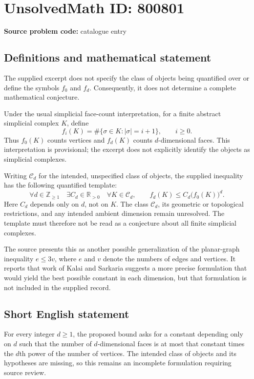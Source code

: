 \documentclass[11pt]{article}
\newcommand{\Z}{\mathbb{Z}}
\newcommand{\R}{\mathbb{R}}
\begin{document}
\section*{UnsolvedMath ID: 800801}
\textbf{Source problem code:} catalogue entry
\subsection{Definitions and mathematical statement}
The supplied excerpt does not specify the class of objects being quantified over or define the symbols \(f_0\) and \(f_d\). Consequently, it does not determine a complete mathematical conjecture.

Under the usual simplicial face-count interpretation, for a finite abstract simplicial complex \(K\), define
\[
f_i(K)=\#\{\sigma\in K:|\sigma|=i+1\},\qquad i\geq 0.
\]
Thus \(f_0(K)\) counts vertices and \(f_d(K)\) counts \(d\)-dimensional faces. This interpretation is provisional; the excerpt does not explicitly identify the objects as simplicial complexes.

Writing \(\mathcal{C}_d\) for the intended, unspecified class of objects, the supplied inequality has the following quantified template:
\[
\forall d\in\Z_{\geq 1}\quad \exists C_d\in\R_{>0}\quad
\forall K\in\mathcal{C}_d,\qquad
f_d(K)\leq C_d\bigl(f_0(K)\bigr)^d.
\]
Here \(C_d\) depends only on \(d\), not on \(K\). The class \(\mathcal{C}_d\), its geometric or topological restrictions, and any intended ambient dimension remain unresolved. The template must therefore not be read as a conjecture about all finite simplicial complexes.

The source presents this as another possible generalization of the planar-graph inequality \(e\leq 3v\), where \(e\) and \(v\) denote the numbers of edges and vertices. It reports that work of Kalai and Sarkaria suggests a more precise formulation that would yield the best possible constant in each dimension, but that formulation is not included in the supplied record.
\subsection{Short English statement}
For every integer \(d\geq 1\), the proposed bound asks for a constant depending only on \(d\) such that the number of \(d\)-dimensional faces is at most that constant times the \(d\)th power of the number of vertices. The intended class of objects and its hypotheses are missing, so this remains an incomplete formulation requiring source review.
\end{document}
